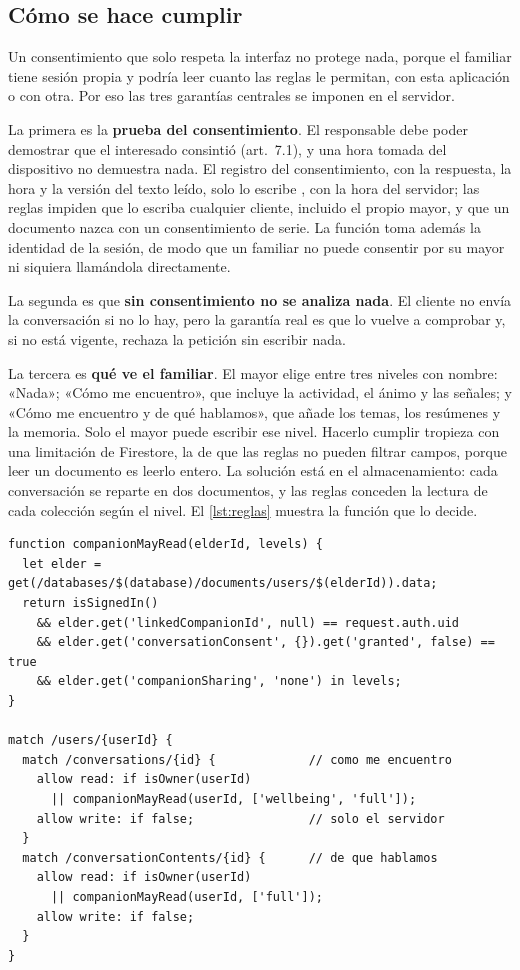 \subsection{Cómo se hace cumplir}

Un consentimiento que solo respeta la interfaz no protege nada, porque el familiar tiene sesión propia y
podría leer cuanto las reglas le permitan, con esta aplicación o con otra. Por eso las tres garantías
centrales se imponen en el servidor.

La primera es la \textbf{prueba del consentimiento}. El responsable debe poder demostrar que el interesado
consintió (art.~7.1), y una hora tomada del dispositivo no demuestra nada. El registro del consentimiento,
con la respuesta, la hora y la versión del texto leído, solo lo escribe , con la
hora del servidor; las reglas impiden que lo escriba cualquier cliente, incluido el propio mayor, y que un
documento nazca con un consentimiento de serie. La función toma además la identidad de la sesión, de modo que
un familiar no puede consentir por su mayor ni siquiera llamándola directamente.

La segunda es que \textbf{sin consentimiento no se analiza nada}. El cliente no envía la conversación si no
lo hay, pero la garantía real es que  lo vuelve a comprobar y, si no está vigente,
rechaza la petición sin escribir nada.

La tercera es \textbf{qué ve el familiar}. El mayor elige entre tres niveles con nombre: «Nada»;
«Cómo me encuentro», que incluye la actividad, el ánimo y las señales; y «Cómo me encuentro y de qué
hablamos», que añade los temas, los resúmenes y la memoria. Solo el mayor puede escribir ese nivel. Hacerlo
cumplir tropieza con una limitación de Firestore, la de que las reglas no pueden filtrar campos,
porque leer un documento es leerlo entero. La solución está en el almacenamiento: cada conversación se
reparte en dos documentos, y las reglas conceden la lectura de cada colección según el nivel. El
\autoref{lst:reglas} muestra la función que lo decide.

\begin{lstlisting}[float=tbp, caption={Regla de lectura del familiar sobre el análisis del mayor (extracto de \texttt{firestore.rules}).}, label={lst:reglas}]
function companionMayRead(elderId, levels) {
  let elder = get(/databases/$(database)/documents/users/$(elderId)).data;
  return isSignedIn()
    && elder.get('linkedCompanionId', null) == request.auth.uid
    && elder.get('conversationConsent', {}).get('granted', false) == true
    && elder.get('companionSharing', 'none') in levels;
}

match /users/{userId} {
  match /conversations/{id} {             // como me encuentro
    allow read: if isOwner(userId)
      || companionMayRead(userId, ['wellbeing', 'full']);
    allow write: if false;                // solo el servidor
  }
  match /conversationContents/{id} {      // de que hablamos
    allow read: if isOwner(userId)
      || companionMayRead(userId, ['full']);
    allow write: if false;
  }
}
\end{lstlisting}

